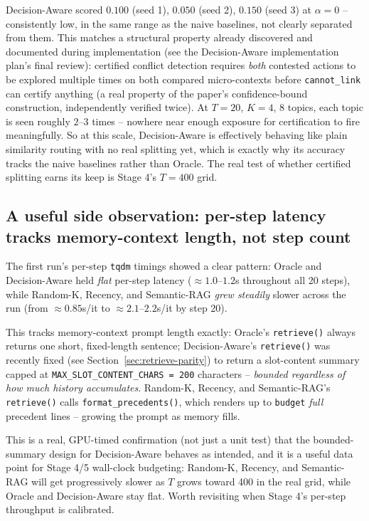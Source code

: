 \documentclass[11pt]{article}
\begin{document}
Decision-Aware scored $0.100$ (seed 1), $0.050$ (seed 2), $0.150$ (seed
3) at $\alpha=0$ -- consistently low, in the same range as the naive
baselines, not clearly separated from them. This matches a structural
property already discovered and documented during implementation (see
the Decision-Aware implementation plan's final review): certified
conflict detection requires \emph{both} contested actions to be
explored multiple times on both compared micro-contexts before
\texttt{cannot\_link} can certify anything (a real property of the
paper's confidence-bound construction, independently verified twice). At
$T=20$, $K=4$, 8 topics, each topic is seen roughly $2$--$3$ times --
nowhere near enough exposure for certification to fire meaningfully. So
at this scale, Decision-Aware is effectively behaving like plain
similarity routing with no real splitting yet, which is exactly why its
accuracy tracks the naive baselines rather than Oracle. The real test of
whether certified splitting earns its keep is Stage 4's $T=400$ grid.

\subsection{A useful side observation: per-step latency tracks
memory-context length, not step count}

The first run's per-step \texttt{tqdm} timings showed a clear pattern:
Oracle and Decision-Aware held \emph{flat} per-step latency
($\approx 1.0$--$1.2$s throughout all 20 steps), while Random-K,
Recency, and Semantic-RAG \emph{grew steadily} slower across the run
(from $\approx 0.85$s/it to $\approx 2.1$--$2.2$s/it by step 20).

This tracks memory-context prompt length exactly: Oracle's
\texttt{retrieve()} always returns one short, fixed-length sentence;
Decision-Aware's \texttt{retrieve()} was recently fixed (see
Section~\ref{sec:retrieve-parity}) to return a slot-content summary
capped at \texttt{MAX\_SLOT\_CONTENT\_CHARS = 200} characters --
\emph{bounded regardless of how much history accumulates}. Random-K,
Recency, and Semantic-RAG's \texttt{retrieve()} calls
\texttt{format\_precedents()}, which renders up to \texttt{budget}
\emph{full} precedent lines -- growing the prompt as memory fills.

This is a real, GPU-timed confirmation (not just a unit test) that the
bounded-summary design for Decision-Aware behaves as intended, and it is
a useful data point for Stage 4/5 wall-clock budgeting: Random-K,
Recency, and Semantic-RAG will get progressively slower as $T$ grows
toward 400 in the real grid, while Oracle and Decision-Aware stay flat.
Worth revisiting when Stage 4's per-step throughput is calibrated.
\end{document}
